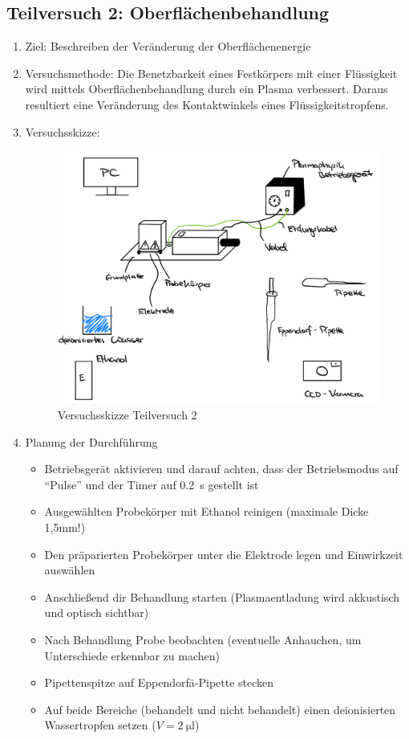 \documentclass{article}
\begin{document}
\subsection{Teilversuch 2: Oberflächenbehandlung}
\begin{enumerate}[label = (\Roman*)]
    \item Ziel: Beschreiben der Veränderung der Oberflächenenergie
    
    \item Versuchsmethode: Die Benetzbarkeit eines Festkörpers mit einer Flüssigkeit wird mittels Oberflächenbehandlung durch ein Plasma verbessert. Daraus resultiert eine Veränderung des Kontaktwinkels eines Flüssigkeitstropfens.
    
    \item Versuchsskizze:
    
        \begin{figure}[H]
        \centering
        \includegraphics[width=0.7\linewidth]{Abbildungen/SkizzeTV2.jpeg}
        \caption{Versuchsskizze Teilversuch 2}
        \end{figure}

    \item Planung der Durchführung
        \begin{itemize}
           \item Betriebsgerät aktivieren und darauf achten, dass der Betriebsmodus auf ``Pulse'' und der Timer auf \qty{.2}{\s} gestellt ist
           \item Ausgewählten Probekörper mit Ethanol reinigen (maximale Dicke 1,5mm!)
           \item Den präparierten Probekörper unter die Elektrode legen und Einwirkzeit auswählen
           \item Anschließend dir Behandlung starten (Plasmaentladung wird akkustisch und optisch sichtbar)
           \item Nach Behandlung Probe beobachten (eventuelle Anhauchen, um Unterschiede erkennbar zu machen)
           \item Pipettenspitze auf Eppendorfä-Pipette stecken
           \item Auf beide Bereiche (behandelt und nicht behandelt) einen deionisierten Wassertropfen setzen ($V = \qty{2}{\ul}$)
        \end{itemize}


\end{enumerate}
\end{document}
